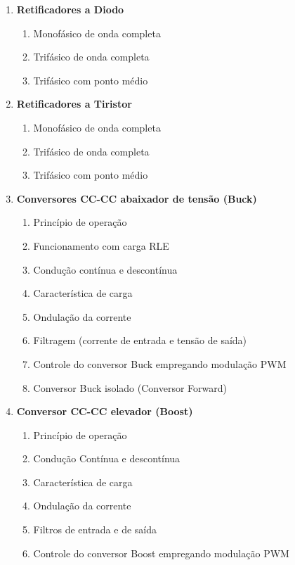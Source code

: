\documentclass[
	article,			%
	12pt,				%
	twoside,			%
	a4paper,			%
	english,			%
	brazil,				%
	sumario=tradicional
]{abntex2-modelo-plano-de-aula}
\begin{document}
\begin{enumerate}      	
	\item\textbf{Retificadores a Diodo}
	\begin{enumerate}
		\item Monofásico de onda completa
		\item Trifásico de onda completa
		\item Trifásico com ponto médio
	\end{enumerate}
	\item\textbf{Retificadores a Tiristor}
	\begin{enumerate}
		\item Monofásico de onda completa
		\item Trifásico de onda completa
		\item Trifásico com ponto médio
	\end{enumerate}       		
	
	
	\item \textbf{Conversores CC-CC abaixador de tensão (Buck)}
	\begin{enumerate}
		\item Princípio de operação	
		\item Funcionamento com carga RLE
		\item Condução contínua e descontínua
		\item Característica de carga
		\item Ondulação da corrente
		\item Filtragem (corrente de entrada e tensão de saída)
		\item Controle do conversor Buck empregando modulação PWM
		\item Conversor Buck isolado (Conversor Forward)  	
	\end{enumerate}  
	
	\item \textbf{Conversor CC-CC elevador (Boost)}
	\begin{enumerate}
		\item Princípio de operação
		\item Condução Contínua e descontínua
		\item Característica de carga
		\item Ondulação da corrente
		\item Filtros de entrada e de saída
		\item Controle do conversor Boost empregando modulação PWM
	\end{enumerate}        		
	

\end{enumerate}
\end{document}

